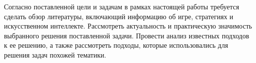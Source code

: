Согласно поставленной цели и задачам в рамках настоящей работы требуется сделать обзор литературы, включающий информацию об игре, стратегиях и искусственном интеллекте. Рассмотреть актуальность и практическую значимость выбранного решения поставленной задачи. Провести анализ известных подходов к ее решению, а также рассмотреть подходы, которые использовались для решения задач похожей тематики.
